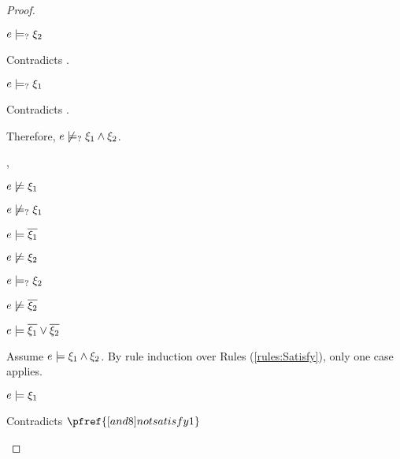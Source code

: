 \begin{proof}
\begin{byCases}
\begin{byCases}
\begin{byCases}
            \begin{pfsteps*}
            \item $e \models_{?} \xi_2$ 
            \end{pfsteps*}
            Contradicts .
        \item[\text{(\ref{rule:CMSAnd3})}]
            \begin{pfsteps*}
            \item $e \models_{?} \xi_1$ 
            \end{pfsteps*}
            Contradicts .
        \end{byCases}
        Therefore, $e \not\models_{?} \xi_1 \wedge \xi_2$.
    \item[\csatisfy{e}{\cdual{\xi_1}},\cmaysatisfy{e}{\xi_2}]
        \begin{pfsteps*}
        \item $e \not\models \xi_1$  
        \item $e \not\models_{?} \xi_1$  
        \item $e \models \overline{\xi_1}$  
        \item $e \not\models \xi_2$  
        \item $e \models_{?} \xi_2$  
        \item $e \not\models \overline{\xi_2}$  
        \item $e \models \overline{\xi_1} \vee \overline{\xi_2}$  
        \end{pfsteps*}
        Assume $e \models \xi_1 \wedge \xi_2$. By rule induction over Rules (\ref{rules:Satisfy}), only one case applies.
        \begin{byCases}
        \item[\text{(\ref{rule:CSAnd})}]
            \begin{pfsteps*}
            \item $e \models \xi_1$ 
            \end{pfsteps*}
            Contradicts $\pfref{[and8]notsatisfy1}$
        \end{byCases}

\end{byCases}
\end{byCases}
\end{proof}
